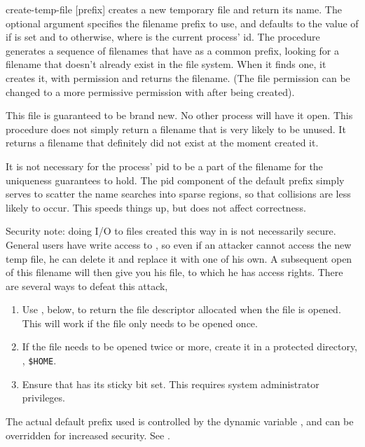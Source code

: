 \begin{defundesc}  {create-temp-file}  {[prefix]}         \str
     creates a new temporary file and return its name.
    The optional argument specifies the filename prefix to use, and defaults
    to the value of  if \TMPDIR{} is set and to
     otherwise, where  is the current process' id.
    The procedure generates a sequence of filenames that have  as
    a common prefix, looking for a filename that doesn't already exist in the
    file system. When it finds one, it creates it, with permission 
    and returns the filename. (The file permission can be changed to a more
    permissive permission with  after being created).

    This file is guaranteed to be brand new. No other process will have it
    open. This procedure does not simply return a filename that is very
    likely to be unused. It returns a filename that definitely did not exist
    at the moment  created it.

    It is not necessary for the process' pid to be a part of the filename
    for the uniqueness guarantees to hold. The pid component of the default
    prefix simply serves to scatter the name searches into sparse regions, so
    that collisions are less likely to occur. This speeds things up, but does
    not affect correctness.

    Security note: doing I/O to files created this way in  is
    not necessarily secure. General users have write access to ,
    so even if an attacker cannot access the new temp file, he can delete it
    and replace it with one of his own. A subsequent open of this filename
    will then give you his file, to which he has access rights. There are
    several ways to defeat this attack,
    \begin{enumerate}
        \item Use , below, to return the file descriptor
           allocated when the file is opened. This will work if the file
           only needs to be opened once.
        \item If the file needs to be opened twice or more, create it in a 
           protected directory, \eg, \verb|$HOME|.%
        \item Ensure that  has its sticky bit set. This
           requires system administrator privileges.
    \end{enumerate}
    The actual default prefix used is controlled by the dynamic variable
    , and can be overridden for increased security.
    See .
\end{defundesc}

